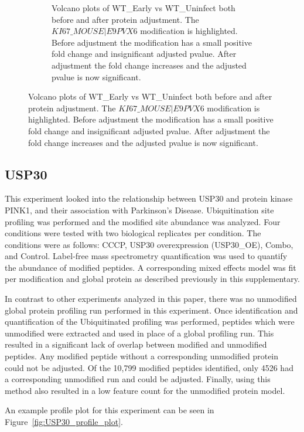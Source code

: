 \documentclass{mcp}
\def\sfigref#1{{Figure~\ref{#1}}}
\begin{document}
\begin{figure}[h!]
\begin{subfigure}{\textwidth}
	\caption{Volcano plots of WT\_Early vs WT\_Uninfect both before and after protein adjustment. The $KI67\_MOUSE|E9PVX6$ modification is highlighted. Before adjustment the modification has a small positive fold change and insignificant adjusted pvalue. After adjustment the fold change increases and the adjusted pvalue is now significant.}
 \end{subfigure}
\label{fig:Diff_Shigella_PTM}
\end{figure}

\clearpage

\subsection{USP30}

This experiment looked into the relationship between USP30 and protein kinase PINK1, and their association with Parkinson's Disease. Ubiquitination site profiling was performed and the modified site abundance was analyzed. Four conditions were tested with two biological replicates per condition. The conditions were as follows: CCCP, USP30 overexpression (USP30\_OE), Combo, and Control. Label-free mass spectrometry quantification was used to quantify the abundance of modified peptides. A corresponding mixed effects model was fit per modification and global protein as described previously in this supplementary.

In contrast to other experiments analyzed in this paper, there was no unmodified global protein profiling run performed in this experiment. Once identification and quantification of the Ubiquitinated profiling was performed, peptides which were unmodified were extracted and used in place of a global profiling run. This resulted in a significant lack of overlap between modified and unmodified peptides. Any modified peptide without a corresponding unmodified protein could not be adjusted. Of the 10,799 modified peptides identified, only 4526 had a corresponding unmodified run and could be adjusted. Finally, using this method also resulted in a low feature count for the unmodified protein model.

An example profile plot for this experiment can be seen in \sfigref{fig:USP30_profile_plot}.
\end{document}
